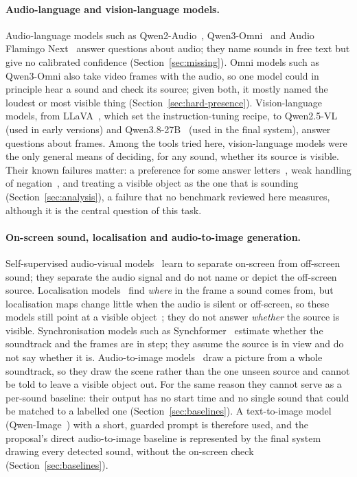 \paragraph{Audio-language and vision-language models.} Audio-language models such as Qwen2-Audio~\cite{chu2024qwen2audio},
Qwen3-Omni~\cite{xu2025qwen3omni} and Audio Flamingo Next~\cite{afnextcard} answer questions about audio; they name sounds in
free text but give no calibrated confidence (Section~\ref{sec:missing}). Omni models such as Qwen3-Omni also take
video frames with the audio, so one model could in principle hear a sound and check its source; given both, it mostly
named the loudest or most visible thing (Section~\ref{sec:hard-presence}). Vision-language models, from LLaVA~\cite{liu2023llava}, which set the instruction-tuning recipe,
to Qwen2.5-VL~\cite{bai2025qwen25vl} (used in early versions) and Qwen3.8-27B~\cite{qwen38card} (used in the final
system), answer questions about frames. Among the tools tried here, vision-language models were the only general means of
deciding, for any sound, whether its source is visible. Their known failures matter: a preference for some answer
letters~\cite{zheng2024pride}, weak handling of negation~\cite{alhamoud2025negbench}, and treating a visible object as
the one that is sounding (Section~\ref{sec:analysis}), a failure that no benchmark reviewed here measures, although it is the central
question of this task.

\paragraph{On-screen sound, localisation and audio-to-image generation.} Self-supervised audio-visual
models~\cite{owens2018multisensory,tzinis2021audioscope} learn to separate on-screen from off-screen sound; they
separate the audio signal and do not name or depict the off-screen source. Localisation
models~\cite{senocak2023alignment,um2025objaware} find \emph{where} in the frame a sound comes from, but localisation maps
change little when the audio is silent or off-screen, so these models still point at a visible
object~\cite{juanola2025critical}; they do not answer \emph{whether} the source is visible. Synchronisation models such
as Synchformer~\cite{iashin2024synchformer} estimate whether the soundtrack and the frames are in step; they assume the
source is in view and do not say whether it is.
Audio-to-image models~\cite{sungbin2023sound2scene,biner2024sonicdiffusion,ge2026audiocanvas} draw a picture from a whole
soundtrack, so they draw the scene rather than the one unseen source and cannot be told to leave a visible object out.
For the same reason they cannot serve as a per-sound baseline: their output has no start time and no single sound
that could be matched to a labelled one (Section~\ref{sec:baselines}).
A text-to-image model (Qwen-Image~\cite{wu2025qwenimage,qwenimage2512card}) with a short, guarded prompt is therefore
used, and the proposal's direct audio-to-image baseline is represented by the final system drawing every detected
sound, without the on-screen check (Section~\ref{sec:baselines}).

